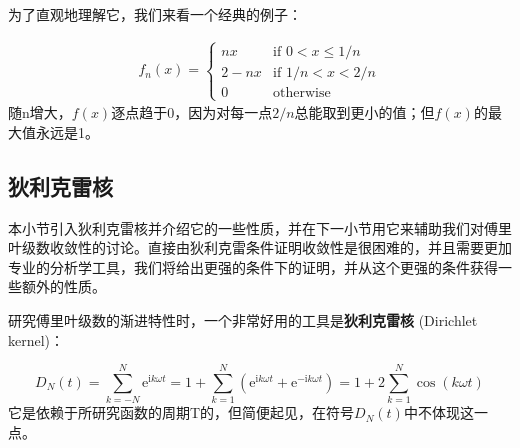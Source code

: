 为了直观地理解它，我们来看一个经典的例子：
\begin{example}
    \begin{align*}
    f_n(x)=
    \begin{cases}
        nx   & \text{if } 0<x\leq 1/n        \\
        2-nx & \text{if } 1/n<x<2/n \\
        0    & \text{otherwise}
    \end{cases}
\end{align*}
随n增大，$f(x)$逐点趋于0，因为对每一点$2/n$总能取到更小的值；但$f(x)$的最大值永远是1。
\end{example}

\subsection{狄利克雷核}\label{sub:dirichlet_kernel}
本小节引入狄利克雷核并介绍它的一些性质，并在下一小节用它来辅助我们对傅里叶级数收敛性的讨论。直接由狄利克雷条件证明收敛性是很困难的，并且需要更加专业的分析学工具，我们将给出更强的条件下的证明，并从这个更强的条件获得一些额外的性质。

研究傅里叶级数的渐进特性时，一个非常好用的工具是\textbf{狄利克雷核} (Dirichlet kernel)：
\begin{definition}[狄利克雷核]
    \[D_N(t)=\sum_{k=-N}^{N}\mathrm{e}^{\mathrm{i}k\omega t}=1+\sum_{k=1}^{N}\left(\mathrm{e}^{\mathrm{i}k\omega t}+\mathrm{e}^{-\mathrm{i}k\omega t}\right)=1+2\sum_{k=1}^{N}\cos(k\omega t)\]
    它是依赖于所研究函数的周期T的，但简便起见，在符号$D_N(t)$中不体现这一点。
\end{definition}

